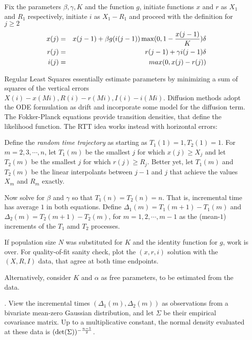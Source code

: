 \documentclass{article}
\begin{document}
{\bigskip

Fix the parameters $\beta, \gamma, K$ and the function $g$, initiate functions $x$ and $r$ as $X_1$ and $R_1$ respectively, initiate $i$ as $X_1-R_1$ and proceed with the definition for $j \ge 2$
\begin{eqnarray}
x(j)&=&x(j-1)+\beta g(i(j-1))\max(0,1-{{x(j-1)} \over K}) \delta \nonumber \\
r(j)&=&r(j-1)+\gamma i(j-1) \delta \nonumber \\
i(j)&=&max(0,x(j)-r(j)) \label{thesolution}
\end{eqnarray}

Regular Least Squares essentially estimate parameters by minimizing a sum of squares of the vertical errors $X(i)-x(M i), R(i)-r(M i), I(i)-i(M i)$. Diffusion methods adopt the ODE formulation as drift and incorporate some model for the diffusion term. The Fokker-Planck equations provide transition densities, that define the likelihood function.
The RTT idea works instead with horizontal errors:

\bigskip

Define the {\em random time trajectory} as starting as $T_1(1)=1, T_2(1)=1$. For $m=2,3,\cdots,n$, let $T_1(m)$ be the smallest $j$ for which $x(j) \ge X_j$ and let $T_2(m)$ be the smallest $j$ for which $r(j) \ge R_j$. Better yet, let $T_1(m)$ and $T_2(m)$ be the linear interpolants between $j-1$ and $j$ that achieve the values $X_m$ and $R_m$ exactly.

Now solve for $\beta$ and $\gamma$ so that $T_1(n)=T_2(n)=n$. That is, incremental time has average $1$ in both equations. Define $\Delta_1(m)=T_1(m+1)-T_1(m)$ and $\Delta_2(m)=T_2(m+1)-T_2(m)$, for $m=1, 2, \cdots,m-1$ as the (mean-$1$) increments of the $T_1$ amd $T_2$ processes.

\bigskip

If population size $N$ was substituted for $K$ and the identity function for $g$, work is over. For quality-of-fit sanity check, plot the $(x,r,i)$ solution with the $(X,R,I)$ data, that agree at both time endpoints.

Alternatively, consider $K$ and $\alpha$ as free parameters, to be estimated from the data.

\bigskip

. View the incremental times \linebreak $(\Delta_1(m),\Delta_2(m))$ as observations from a bivariate mean-zero Gaussian distribution, and let $\Sigma$ be their empirical covariance matrix. Up to a multiplicative constant, the normal density evaluated at these data is $(\det(\Sigma))^{-{{n-1} \over 2}}$.

}
\end{document}
